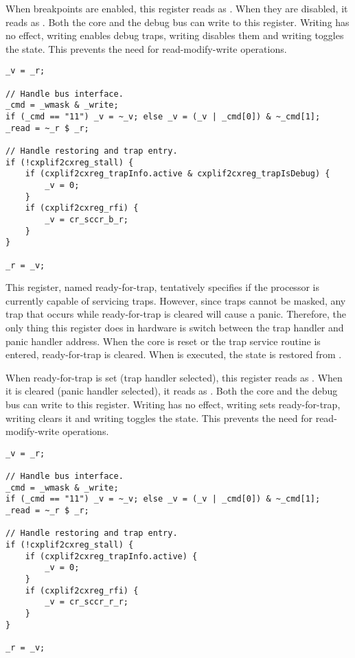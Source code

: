 When breakpoints are enabled, this register reads as . When they are 
disabled, it reads as . Both the core and the debug bus can write to 
this register. Writing  has no effect, writing  enables debug 
traps, writing  disables them and writing  toggles the state. 
This prevents the need for read-modify-write operations.

\declaration{}
\implementation{}
\begin{lstlisting}
_v = _r;

// Handle bus interface.
_cmd = _wmask & _write;
if (_cmd == "11") _v = ~_v; else _v = (_v | _cmd[0]) & ~_cmd[1];
_read = ~_r $ _r;

// Handle restoring and trap entry.
if (!cxplif2cxreg_stall) {
    if (cxplif2cxreg_trapInfo.active & cxplif2cxreg_trapIsDebug) {
        _v = 0;
    }
    if (cxplif2cxreg_rfi) {
        _v = cr_sccr_b_r;
    }
}

_r = _v;
\end{lstlisting}

This register, named ready-for-trap, tentatively specifies if the processor is
currently capable of servicing traps. However, since traps cannot be masked,
any trap that occurs while ready-for-trap is cleared will cause a panic.
Therefore, the only thing this register does in hardware is switch between the
trap handler and panic handler address. When the core is reset or the trap
service routine is entered, ready-for-trap is cleared. When  is 
executed, the state is restored from .

When ready-for-trap is set (trap handler selected), this register reads as 
. When it is cleared (panic handler selected), it reads as . 
Both the core and the debug bus can write to this register. Writing  
has no effect, writing  sets ready-for-trap, writing  clears 
it and writing  toggles the state. This prevents the need for 
read-modify-write operations.

\declaration{}
\implementation{}
\begin{lstlisting}
_v = _r;

// Handle bus interface.
_cmd = _wmask & _write;
if (_cmd == "11") _v = ~_v; else _v = (_v | _cmd[0]) & ~_cmd[1];
_read = ~_r $ _r;

// Handle restoring and trap entry.
if (!cxplif2cxreg_stall) {
    if (cxplif2cxreg_trapInfo.active) {
        _v = 0;
    }
    if (cxplif2cxreg_rfi) {
        _v = cr_sccr_r_r;
    }
}

_r = _v;
\end{lstlisting}


